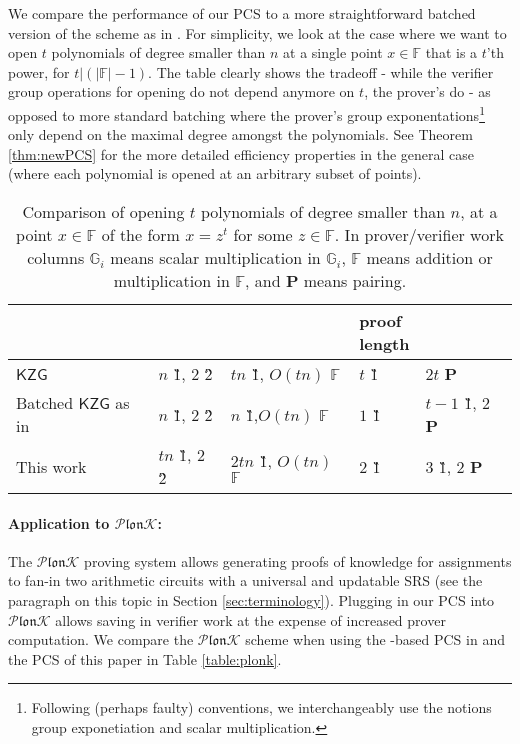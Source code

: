 \documentclass[11pt]{article} %
\newcommand{\Gi}{\ensuremath{{\mathbb G}_i}\xspace}
\newcommand{\F}{\ensuremath{\mathbb F}\xspace}
\newcommand{\kate}{\ensuremath{\mathsf{KZG}}\xspace}
\newcommand{\plonk}{\ensuremath{\mathcal{P} \mathfrak{lon}\mathcal{K}}\xspace}
\newcommand{\prg}[1]{ \paragraph{\textbf{#1}}}
\begin{document}
We compare the performance of our PCS to a more straightforward batched version of the \cite{kate} scheme as in \cite{plonk}.
For simplicity, we look at the case where we want to open $t$ polynomials of degree smaller than $n$ at a single point $x\in \F$ that is a $t$'th power, for $t|(|\F|-1)$. The table clearly shows the tradeoff - while the verifier group operations for opening do not depend anymore on $t$, the prover's do - as opposed to more standard batching where the prover's group exponentations\footnote{Following (perhaps faulty) conventions, we interchangeably use the notions group exponetiation and scalar multiplication.} only depend on the maximal degree amongst the polynomials.
See Theorem \ref{thm:newPCS} for the more detailed efficiency properties in the general case (where each polynomial is opened at an arbitrary subset of points).
\begin{table}[!htbp]
	\caption{Comparison of opening $t$ polynomials of degree smaller than $n$, at a  point $x\in \F$ of the form $x=z^t$ for some $z\in \F$. In prover/verifier work columns \Gi means scalar multiplication in \Gi, \F means addition or multiplication in \F, and \textbf{P} means pairing. }
	\centering
\begin{adjustbox}{width=1\textwidth}
	\begin{tabular}{l|l|l|l|l}
	& \thead{SRS size} & \thead{prover work} & \thead{proof\\ length} & \thead{verifier group operations} \\ \hline
		\kate 
		         & $n$ \G1, $2$ \G2  & $t n$ \G1, $O(t n)$ \F&   $t$ \G1 &   $2t$ \textbf{P}\\ \hline
		Batched \kate as in \cite{sonic,marlin,plonk}     & $n$ \G1, $2$ \G2 &   $n$ \G1,$O(t n)$ \F  & $1$ \G1 & $t-1$ \G1, $2$ \textbf{P}   \\ \hline
	This work     & $t n$ \G1, $2$ \G2 &   $2tn$ \G1, $O(t n)$ \F& 2 \G1 &  $3$ \G1, $2$ \textbf{P}   \\ \hline

	\end{tabular}
\end{adjustbox}
\label{table:prover-work}
\end{table}



\prg{Application to \plonk:}


The \plonk proving system \cite{plonk}  allows generating proofs of knowledge for assignments
to fan-in two arithmetic circuits with a universal and updatable SRS (see the paragraph on this topic in Section \ref{sec:terminology}).  Plugging in our PCS into \plonk allows saving in verifier work at the expense of increased prover computation.
We compare the \plonk scheme when using the  \cite{kate}-based PCS in \cite{plonk} and the PCS of this paper in Table \ref{table:plonk}. 
\end{document}
